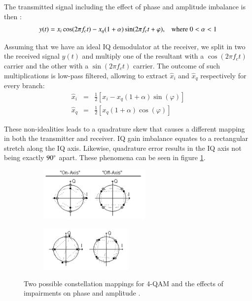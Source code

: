 \documentclass[12pt,a4paper,openright]{report}
\begin{document}
The transmitted signal including the effect of phase and amplitude imbalance is then \cite{Madhow}:
\begin{equation}\label{eq:MQAMimpairedRcvdSignal}
y(t) = {x_i}\cos (2\pi {f_c}t) - {x_q}(1 + \alpha )\sin (2\pi {f_c}t + \varphi ) \text{,\quad where }0 < \alpha < 1
\end{equation}

Assuming that we have an ideal IQ demodulator at the receiver, we split in two the received signal $y(t)$ and multiply one of the resultant with a $\cos (2\pi {f_c}t)$ carrier and the other with a $\sin (2\pi {f_c}t)$ carrier. The outcome of such multiplications is low-pass filtered, allowing to extract  $\hat{x}_i$ and $\hat{x}_q$ respectively for every branch:
\begin{eqnarray}
{{\hat x}_i} & = & \frac{1}{2}\left[ {{x_i} - {x_q}(1 + \alpha )\sin (\varphi )} \right]\\
{{\hat x}_q} & = & \frac{1}{2}\left[ {{x_q}(1 + \alpha )\cos (\varphi )} \right]
\end{eqnarray}

These non-idealities leads to a quadrature skew that causes a different mapping in both the transmitter and receiver. IQ gain imbalance equates to a rectangular stretch along the IQ axis. Likewise, quadrature error results in the IQ axis not being exactly $90\degree$ apart. These phenomena can be seen in figure \ref{fig:skewed}.


\begin{figure}[H]
 \centering
	\begin{subfigure}[H]{0.9\textwidth}
 	\centering
    \includegraphics[width=0.6\textwidth]{gi.pdf}

	\end{subfigure}
	
	\begin{subfigure}[H]{0.9\textwidth}
 	\centering
    \includegraphics[width=0.5\textwidth]{qe.pdf}
 	\end{subfigure}
    \caption[Two possible constellation mappings for 4-QAM]{Two possible constellation mappings for 4-QAM and the effects of impairments on phase and amplitude \cite{Agilent IQ paper}.}
    \label{fig:skewed}
\end{figure}
\end{document}
